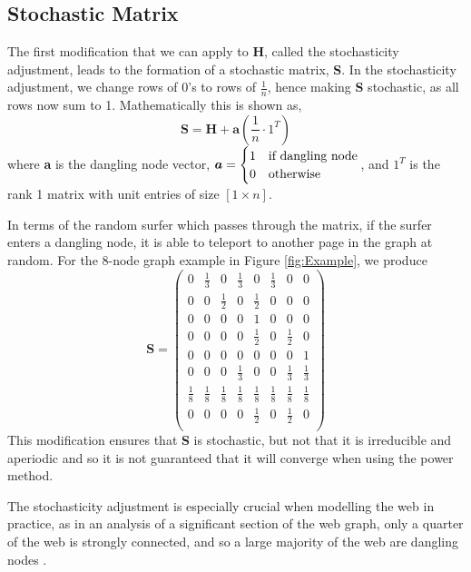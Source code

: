 \documentclass[11pt]{report}
\begin{document}
\subsection{Stochastic Matrix} \label{sec:stoc}
The first modification that we can apply to \textbf{H}, called the stochasticity adjustment, leads to the formation of a stochastic matrix, \textbf{S}. In the stochasticity adjustment, we change rows of 0's to rows of $\frac{1}{n}$, hence making \textbf{S} stochastic, as all rows now sum to 1. Mathematically this is shown as, 
\begin{equation*} \label{eq:s}
\textbf{S} = \textbf{H} + \textbf{a}\left(\frac{1}{n}\cdot 1^{T}\right)
\end{equation*} 
where \textbf{a} is the dangling node vector, \(\boldsymbol{a} = \begin{cases} 1 & \textnormal{if dangling node} \\ 0 & \textnormal{otherwise} \end{cases}\), and $1^T$ is the rank 1 matrix with unit entries of size $[1\times n]$.

In terms of the random surfer which passes through the matrix, if the surfer enters a dangling node, it is able to teleport to another page in the graph at random. For the 8-node graph example in Figure \ref{fig:Example}, we produce  
\[ \renewcommand*{\arraystretch}{1.25} \textbf{S}=\left(
\begin{array}{cccccccc}
0 & \frac{1}{3} & 0 & \frac{1}{3} & 0 &\frac{1}{3} & 0& 0 \\
0 & 0 &\frac{1}{2}& 0 &\frac{1}{2}& 0 & 0 & 0\\
0 & 0 & 0 & 0 & 1 & 0 & 0 & 0\\
0 & 0 & 0 & 0 & \frac{1}{2} & 0 & \frac{1}{2} & 0\\
0 & 0 & 0 & 0 & 0 & 0 & 0 & 1\\
0 & 0 & 0 & \frac{1}{3} & 0 & 0 & \frac{1}{3} & \frac{1}{3} \\
\frac{1}{8} & \frac{1}{8} & \frac{1}{8} & \frac{1}{8} & \frac{1}{8} & \frac{1}{8} & \frac{1}{8} & \frac{1}{8}\\
0 & 0 & 0 & 0 & \frac{1}{2} & 0 & \frac{1}{2} & 0\\
\end{array}
\right)	\] This modification ensures that \textbf{S} is stochastic, but not that it is irreducible and aperiodic and so it is not guaranteed that it will converge when using the power method.

The stochasticity adjustment is especially crucial when modelling the web in practice, as in an analysis of a significant section of the web graph, only a quarter of the web is strongly connected, and so a large majority of the web are dangling nodes \cite{chakrabarti2002mining}.
\end{document}
